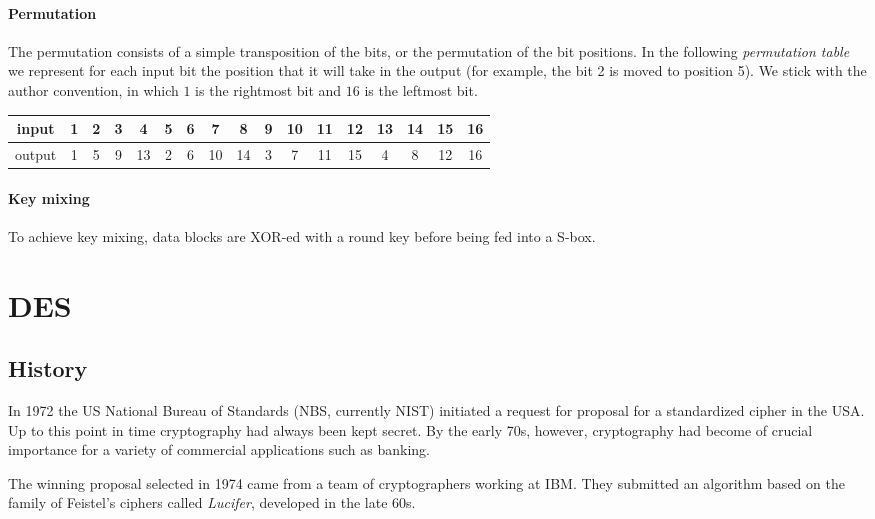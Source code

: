 \documentclass{article}
\begin{document}
  \paragraph{Permutation}
  
  The permutation consists of a simple transposition of the bits, or
  the permutation of the bit positions.
  In the following \emph{permutation table} we represent for each
  input bit the position that it will take in the output (for example,
  the bit 2 is moved to position 5). 
  We stick with the author convention, in which $1$ is the
  rightmost bit and $16$ is the leftmost bit.
  \begin{center}
	\begin{tabular}{|c|c|c|c|c|c|c|c|c|c|c|c|c|c|c|c|c|}
	  \hline
	  input & 1 & 2 & 3 & 4 & 5 & 6 & 7 & 8 & 9 & 10 & 11 & 12 & 13 & 14 & 15& 16 \\
	  \hline
	  output & 1 & 5 & 9 & 13 & 2 & 6 & 10 & 14 & 3 & 7 & 11 & 15 & 4 & 8 &
	  12 & 16 \\
	  \hline
	\end{tabular}
  \end{center}
  
  \paragraph{Key mixing}

  To achieve key mixing, data blocks are XOR-ed with a round key
  before being fed into a S-box.


  
  \section{DES}
  
  \subsection{History} 

  In 1972 the US National Bureau of Standards (NBS, currently NIST)
  initiated a request for proposal for a standardized cipher in the
  USA. Up to this point in time cryptography had always been kept
  secret. By the early 70s, however, cryptography had become of
  crucial importance for a variety of commercial applications such as
  banking.

  The winning proposal selected in 1974 came from a team of
  cryptographers working at IBM.
  They submitted an algorithm based on the family of Feistel's ciphers 
  called \emph{Lucifer}, developed in the late 60s.
\end{document}
